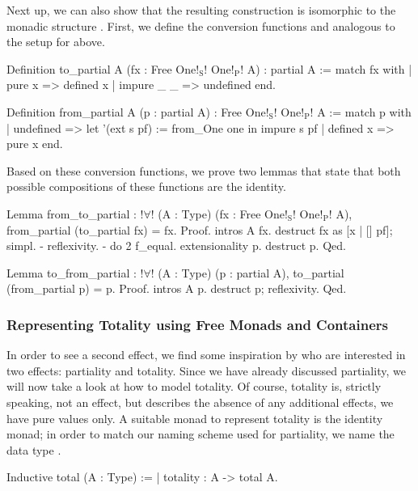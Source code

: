 Next up, we can also show that the resulting construction   is isomorphic to the monadic structure .
First, we define the conversion functions  and  analogous to the setup for  above.

\begin{coqcode}
Definition to_partial A (fx : Free One!$_\text{S}$! One!$_\text{P}$! A) : partial A :=
 match fx with
 | pure x     => defined x
 | impure _ _ => undefined
 end.

Definition from_partial A (p : partial A) : Free One!$_\text{S}$! One!$_\text{P}$! A :=
  match p with
  | undefined => let '(ext s pf) := from_One one in impure s pf
  | defined x => pure x
  end.
\end{coqcode}

Based on these conversion functions, we prove two lemmas that state that both possible compositions of these functions are the identity.

\begin{coqcode}
Lemma from_to_partial : !$\forall$! (A : Type) (fx : Free One!$_\text{S}$! One!$_\text{P}$! A),
    from_partial (to_partial fx) = fx.
Proof.
  intros A fx. destruct fx as [x | [] pf]; simpl.
  - reflexivity.
  - do 2 f_equal. extensionality p. destruct p.
Qed.

Lemma to_from_partial : !$\forall$! (A : Type) (p : partial    A),
    to_partial (from_partial p) = p.
Proof.
  intros A p. destruct p; reflexivity.
Qed.
\end{coqcode}

\subsubsection{Representing Totality using Free Monads and Containers}
\label{subsub:totality_container}
In order to see a second effect, we find some inspiration by \citet{abel2005verifying} who are interested in two effects: partiality and totality.
Since we have already discussed partiality, we will now take a look at how to model totality.
Of course, totality is, strictly speaking, not an effect, but describes the absence of any additional effects, we have pure values only.
A suitable monad to represent totality is the identity monad; in order to match our naming scheme used for partiality, we name the data type .

\begin{coqcode}
Inductive total (A : Type) :=
| totality : A -> total A.
\end{coqcode}

